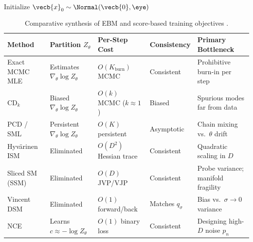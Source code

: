 \documentclass[../../../../master.tex]{subfiles}
\begin{document}
\begin{algorithm}[htbp]
  \caption{Denoising Score Matching (DSM) Training \& Langevin Sampling}
  \label{alg:ebm:dsm}
  Initialize $\vecb{x}_0 \sim \Normal(\vecb{0}, \eye)$\;
\end{algorithm}

\begin{table}[htbp]
\centering
\caption{Comparative synthesis of EBM and score-based training objectives  .}
\label{tab:ebm:comparison}
\renewcommand{\arraystretch}{1.22}
\begin{tabularx}{\textwidth}{@{}l l l l >{\raggedright\arraybackslash}X@{}}
\toprule
\textbf{Method} & \textbf{Partition $Z_\theta$} & \textbf{Per-Step Cost} & \textbf{Consistency} & \textbf{Primary Bottleneck} \\
\midrule
Exact MCMC MLE & Estimates $\nabla_\theta \log Z_\theta$ & $O(K_{\mathrm{burn}})$ MCMC & Consistent & Prohibitive burn-in per step \\
$\mathrm{CD}_k$ & Biased $\nabla_\theta \log Z_\theta$ & $O(k)$ MCMC ($k \approx 1$) & Biased & Spurious modes far from data \\
PCD / SML & Persistent $\nabla_\theta \log Z_\theta$ & $O(K)$ persistent & Asymptotic & Chain mixing vs.\ $\theta$ drift \\
Hyv\"arinen ISM & Eliminated & $O(D^2)$ Hessian trace & Consistent & Quadratic scaling in $D$ \\
Sliced SM (SSM) & Eliminated & $O(D)$ JVP/VJP & Consistent & Probe variance; manifold fragility \\
Vincent DSM & Eliminated & $O(1)$ forward/back & Matches $q_\sigma$ & Bias vs.\ $\sigma\!\to\!0$ variance \\
NCE & Learns $c \approx -\log Z_\theta$ & $O(1)$ binary loss & Consistent & Designing high-$D$ noise $p_n$ \\
\bottomrule
\end{tabularx}
\end{table}
\end{document}
